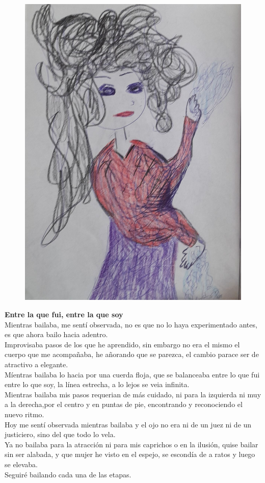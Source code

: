 \documentclass[12pt, a4paper, twoside]{book} %
\begin{document}
\begin{figure}[H]
	\centering
	\includegraphics[width=\textwidth]{./images/1f81324df206df.jpg}
\end{figure}

\clearpage

\noindent\textbf{Entre la que fui, entre la que soy}\\
Mientras bailaba, me sentí observada, no es que no lo haya experimentado antes, es que ahora bailo hacia adentro.\\
Improvisaba pasos de los que he aprendido, sin embargo no era el mismo el cuerpo que me acompañaba, he añorando que se parezca, el cambio parace ser de atractivo a elegante.\\
Míentras bailaba lo hacia por una cuerda floja, que se balanceaba entre lo que fui entre lo que soy, la línea estrecha, a lo lejos se veia  infinita.\\
Mientras bailaba mis pasos requerian de más cuidado, ni para la izquierda ni muy a la derecha,por el centro y en puntas de pie, encontrando y reconociendo el nuevo ritmo.\\
Hoy me sentí observada mientras bailaba y el ojo no era ni de un juez ni de un justiciero, sino del que todo lo vela.\\
Ya no bailaba para la atracción ni para mis caprichos o en la ilusión, quise bailar sin ser alabada, y que mujer he visto en el espejo, se escondía de a ratos y luego se elevaba.\\
Seguiré bailando cada una de las etapas.
\end{document}
